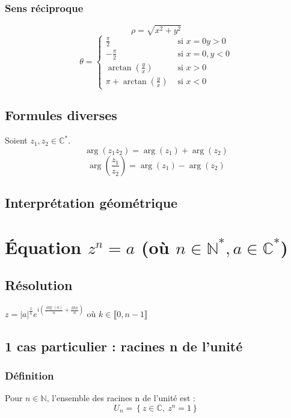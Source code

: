 \documentclass[12pt,a4paper,french]{book}
\begin{document}
			\subsubsection{Sens réciproque}
			\begin{equation*}
				\rho = \sqrt{x^2 + y^2}
			\end{equation*}
			\begin{equation*}
				\theta = \left\{ \begin{array}{ll}
					\frac{\pi}{2} &\mbox{ si } x = 0 y > 0\\
					-\frac{\pi}{2} &\mbox{ si } x = 0, y < 0\\
					\arctan\left(\frac{y}{x}\right) &\mbox{ si } x > 0\\
					\pi + \arctan\left(\frac{y}{x}\right) &\mbox{ si } x < 0
				\end{array}\right.
			\end{equation*}
		\subsection{Formules diverses}
		Soient $z_1,z_2 \in \mathbb{C}^\ast$.
		\[\operatorname{arg}(z_1 z_2) = \operatorname{arg}(z_1)+\operatorname{arg}(z_2)\]
		\[\operatorname{arg}\left(\frac{z_1}{z_2}\right) = \operatorname{arg}(z_1)-\operatorname{arg}(z_2)\]
		\subsection{Interprétation géométrique}
	\section{Équation $z^{n}=a$ (où $n\in \mathbb{N}^{\ast},a\in \mathbb{C}^{\ast}$)}
		\subsection{Résolution}
		$z = \left|a\right|^{\frac{1}{n}} e^{i\left(\frac{\operatorname{arg}(a)}{n} + \frac{2k\pi}{n}\right)}$ où $k \in  \llbracket 0,n-1 \rrbracket$
		\subsection{1 cas particulier : racines n de l'unité}
			\subsubsection{Définition}
			Pour $n \in \mathbb{N}$, l'ensemble des racines n de l'unité est :
			\[U_n = \left\{z \in \mathbb{C}, \ z^n = 1\right\}\]
\end{document}
